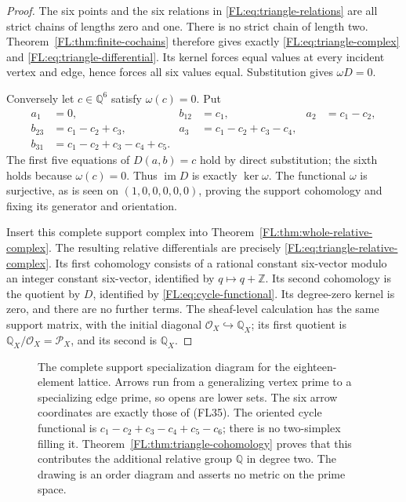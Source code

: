 \documentclass[11pt,a4paper]{article}
\theoremstyle{definition}\newtheorem{definition}[theorem]{Definition}
\providecommand{\PP}{\mathcal P}
\providecommand{\RQ}{\mathbb Q}
\begin{document}
\begin{proof}
The six points and the six relations in \eqref{FL:eq:triangle-relations}
are all strict chains of lengths zero and one. There is no strict
chain of length two. Theorem~\ref{FL:thm:finite-cochains} therefore gives
exactly \eqref{FL:eq:triangle-complex} and
\eqref{FL:eq:triangle-differential}. Its kernel forces equal values at
every incident vertex and edge, hence forces all six values equal.
Substitution gives $\omega D=0$.

Conversely let $c\in\RQ^6$ satisfy $\omega(c)=0$. Put
\[
\begin{aligned}
 a_1&=0,& b_{12}&=c_1,& a_2&=c_1-c_2,\\
 b_{23}&=c_1-c_2+c_3,&a_3&=c_1-c_2+c_3-c_4,\\
 b_{31}&=c_1-c_2+c_3-c_4+c_5.
\end{aligned}
 \tag{FL39}\label{FL:eq:triangle-preimage}
\]
The first five equations of $D(a,b)=c$ hold by direct substitution;
the sixth holds because $\omega(c)=0$. Thus $\operatorname{im}D$
is exactly $\ker\omega$. The functional $\omega$ is surjective,
as is seen on $(1,0,0,0,0,0)$, proving the support cohomology and
fixing its generator and orientation.

Insert this complete support complex into
Theorem~\ref{FL:thm:whole-relative-complex}. The resulting relative
differentials are precisely \eqref{FL:eq:triangle-relative-complex}.
Its first cohomology consists of a rational constant six-vector
modulo an integer constant six-vector, identified by $q\mapsto q+\mathbb Z$.
Its second cohomology is the quotient by $D$, identified by
\eqref{FL:eq:cycle-functional}. Its degree-zero kernel is zero, and
there are no further terms. The sheaf-level calculation has the
same support matrix, with the initial diagonal
$\mathcal O_X\hookrightarrow\RQ_X$; its first quotient is
$\RQ_X/\mathcal O_X=\PP_X$, and its second is $\RQ_X$.
\end{proof}

\begin{figure}[ht]
\centering
{}
\caption{The complete support specialization diagram for the
eighteen-element lattice. Arrows run from a generalizing vertex prime
to a specializing edge prime, so opens are lower sets. The six arrow
coordinates are exactly those of (FL35). The oriented cycle functional
is $c_1-c_2+c_3-c_4+c_5-c_6$; there is no two-simplex filling it.
Theorem~\ref{FL:thm:triangle-cohomology} proves that this contributes
the additional relative group $\RQ$ in degree two. The drawing is an
order diagram and asserts no metric on the prime space.}
\end{figure}
\end{document}
